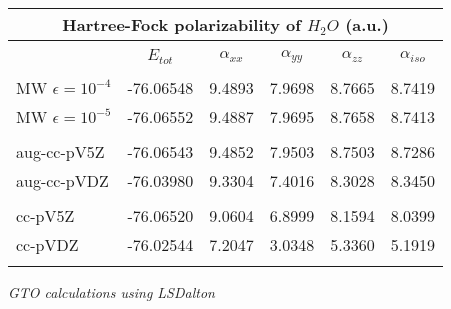 \begin{frame}
\begin{table}
\begin{tabular}{l|c|ccc|c}
\multicolumn{6}{c}{\textbf{Hartree-Fock polarizability of $H_2O$ (a.u.)}}\\
\hline
\hline
                    &          &        &        &        &        \\
                    &$E_{tot}$  &$\alpha_{xx}$  &$\alpha_{yy}$  
                    &$\alpha_{zz}$  &$\alpha_{iso}$ \\
                    &          &        &        &        &        \\
MW $\epsilon=10^{-4}$  &-76.06548 & 9.4893 & 7.9698 & 8.7665 & 8.7419 \\
MW $\epsilon=10^{-5}$  &-76.06552 & 9.4887 & 7.9695 & 8.7658 & 8.7413 \\
                    &          &        &        &        &        \\
aug-cc-pV5Z         &-76.06543 & 9.4852 & 7.9503 & 8.7503 & 8.7286 \\
aug-cc-pVDZ         &-76.03980 & 9.3304 & 7.4016 & 8.3028 & 8.3450 \\
                    &          &        &        &        &        \\
cc-pV5Z             &-76.06520 & 9.0604 & 6.8999 & 8.1594 & 8.0399 \\
cc-pVDZ             &-76.02544 & 7.2047 & 3.0348 & 5.3360 & 5.1919 \\
                    &          &        &        &        &        \\
\hline
\hline
\end{tabular}
\end{table}

\it{GTO calculations using LSDalton}

\end{frame}


